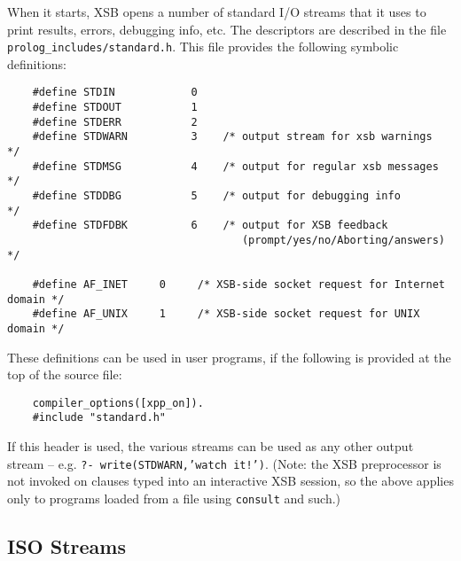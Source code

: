 When it starts, XSB opens a number of standard I/O streams that it
uses to print results, errors, debugging info, etc. The descriptors
are described in the file {\tt prolog\_includes/standard.h}. This file
provides the following symbolic definitions:
\begin{verbatim}
    #define STDIN            0
    #define STDOUT           1
    #define STDERR           2
    #define STDWARN          3    /* output stream for xsb warnings  */
    #define STDMSG           4    /* output for regular xsb messages */
    #define STDDBG           5    /* output for debugging info       */
    #define STDFDBK          6    /* output for XSB feedback
                                     (prompt/yes/no/Aborting/answers) */

    #define AF_INET     0     /* XSB-side socket request for Internet domain */
    #define AF_UNIX     1     /* XSB-side socket request for UNIX domain */
\end{verbatim}
These definitions can be used in user programs, if the following is
provided at the top of the source file:
\begin{verbatim}
    compiler_options([xpp_on]).
    #include "standard.h"
\end{verbatim}
If this header is used, the various streams can be used as any other output stream -- e.g. 
{\tt ?- write(STDWARN,'watch it!')}.
%
(Note: the XSB preprocessor is not invoked on clauses typed into an
interactive XSB session, so the above applies only to programs loaded from
a file using {\tt consult} and such.)

\subsection{ISO Streams}

